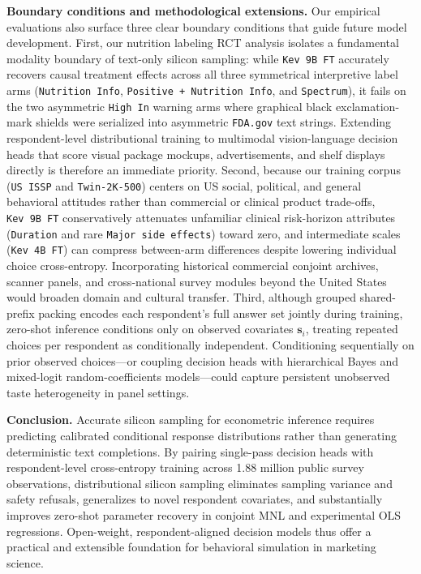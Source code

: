 \documentclass[
  letterpaper,
  DIV=11,
  numbers=noendperiod]{scrartcl}
\begin{document}
\textbf{Boundary conditions and methodological extensions.} Our
empirical evaluations also surface three clear boundary conditions that
guide future model development. First, our nutrition labeling RCT
analysis isolates a fundamental modality boundary of text-only silicon
sampling: while \texttt{Kev\ 9B\ FT} accurately recovers causal
treatment effects across all three symmetrical interpretive label arms
(\texttt{Nutrition\ Info}, \texttt{Positive\ +\ Nutrition\ Info}, and
\texttt{Spectrum}), it fails on the two asymmetric \texttt{High\ In}
warning arms where graphical black exclamation-mark shields were
serialized into asymmetric \texttt{FDA.gov} text strings. Extending
respondent-level distributional training to multimodal vision-language
decision heads that score visual package mockups, advertisements, and
shelf displays directly is therefore an immediate priority. Second,
because our training corpus (\texttt{US\ ISSP} and \texttt{Twin-2K-500})
centers on US social, political, and general behavioral attitudes rather
than commercial or clinical product trade-offs, \texttt{Kev\ 9B\ FT}
conservatively attenuates unfamiliar clinical risk-horizon attributes
(\texttt{Duration} and rare \texttt{Major\ side\ effects}) toward zero,
and intermediate scales (\texttt{Kev\ 4B\ FT}) can compress between-arm
differences despite lowering individual choice cross-entropy.
Incorporating historical commercial conjoint archives, scanner panels,
and cross-national survey modules beyond the United States would broaden
domain and cultural transfer. Third, although grouped shared-prefix
packing encodes each respondent's full answer set jointly during
training, zero-shot inference conditions only on observed covariates
\(\mathbf{s}_i\), treating repeated choices per respondent as
conditionally independent. Conditioning sequentially on prior observed
choices---or coupling decision heads with hierarchical Bayes and
mixed-logit random-coefficients models---could capture persistent
unobserved taste heterogeneity in panel settings.

\textbf{Conclusion.} Accurate silicon sampling for econometric inference
requires predicting calibrated conditional response distributions rather
than generating deterministic text completions. By pairing single-pass
decision heads with respondent-level cross-entropy training across 1.88
million public survey observations, distributional silicon sampling
eliminates sampling variance and safety refusals, generalizes to novel
respondent covariates, and substantially improves zero-shot parameter
recovery in conjoint MNL and experimental OLS regressions. Open-weight,
respondent-aligned decision models thus offer a practical and extensible
foundation for behavioral simulation in marketing science.
\end{document}
